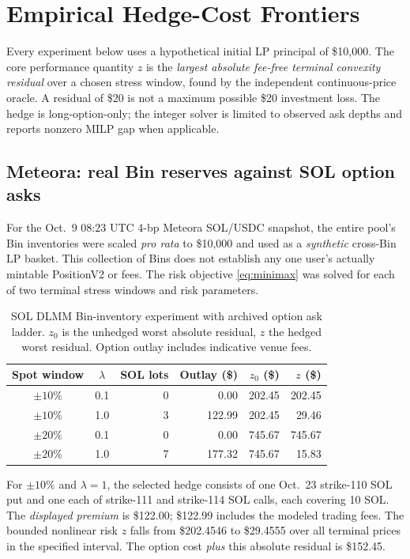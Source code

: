 \section{Empirical Hedge-Cost Frontiers}
Every experiment below uses a hypothetical initial LP principal of \$10,000. The core performance quantity $z$ is the \emph{largest absolute fee-free terminal convexity residual} over a chosen stress window, found by the independent continuous-price oracle. A residual of \$20 is not a maximum possible \$20 investment loss. The hedge is long-option-only; the integer solver is limited to observed ask depths and reports nonzero MILP gap when applicable.

\subsection{Meteora: real Bin reserves against SOL option asks}
For the Oct.\ 9 08:23 UTC 4-bp Meteora SOL/USDC snapshot, the entire pool's Bin inventories were scaled \emph{pro rata} to \$10,000 and used as a \emph{synthetic} cross-Bin LP basket. This collection of Bins does not establish any one user's actually mintable PositionV2 or fees. The risk objective \eqref{eq:minimax} was solved for each of two terminal stress windows and risk parameters.

\begin{table}[ht]
\centering
\caption{SOL DLMM Bin-inventory experiment with archived option ask ladder. $z_0$ is the unhedged worst absolute residual, $z$ the hedged worst residual. Option outlay includes indicative venue fees.}
\label{tab:dlmm}
\small
\begin{tabular}{@{}ccrrrr@{}}
\toprule
Spot window & $\lambda$ & SOL lots & Outlay (\$) & $z_0$ (\$) & $z$ (\$)\\
\midrule
$\pm10\%$ & 0.1 & 0 & 0.00 & 202.45 & 202.45\\
$\pm10\%$ & 1.0 & 3 & 122.99 & 202.45 & 29.46\\
$\pm20\%$ & 0.1 & 0 & 0.00 & 745.67 & 745.67\\
$\pm20\%$ & 1.0 & 7 & 177.32 & 745.67 & 15.83\\
\bottomrule
\end{tabular}
\end{table}

For $\pm10\%$ and $\lambda=1$, the selected hedge consists of one Oct.\ 23 strike-110 SOL put and one each of strike-111 and strike-114 SOL calls, each covering 10 SOL. The \emph{displayed premium} is \$122.00; \$122.99 includes the modeled trading fees. The bounded nonlinear risk $z$ falls from \$202.4546 to \$29.4555 over all terminal prices in the specified interval. The option cost \emph{plus} this absolute residual is \$152.45.

